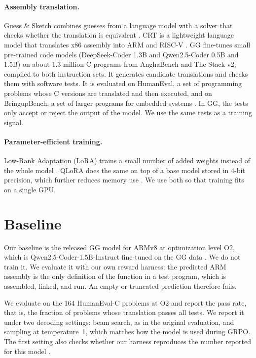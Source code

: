 \documentclass{article}
\newif\iftracked
\newcommand{\added}[1]{\iftracked\hl{#1}\else#1\fi}
\newcommand{\deleted}[1]{\iftracked\textcolor{red}{\st{#1}}\ \fi}
\begin{document}
\paragraph{Assembly translation.}
Guess \& Sketch combines guesses from a language model with a solver that checks whether the translation is equivalent \citep{guesssketch}. CRT is a lightweight language model that translates x86 assembly into ARM and RISC-V \citep{crt}. GG fine-tunes small pre-trained code models (DeepSeek-Coder 1.3B and Qwen2.5-Coder 0.5B and 1.5B) on about 1.3 million C programs from AnghaBench and The Stack v2, compiled to both instruction sets. It generates candidate translations and checks them with software tests. It is evaluated on HumanEval, a set of programming problems whose C versions are translated and then executed, and on BringupBench, a set of larger programs for embedded systems \citep{gg}. In GG, the tests only accept or reject the output of the model. We use the same tests as a training signal.

\paragraph{Parameter-efficient training.}
Low-Rank Adaptation (LoRA) trains a small number of added weights instead of the whole model \citep{lora}. QLoRA does the same on top of a base model stored in 4-bit precision, which further reduces memory use \citep{qlora}. We use both so that training fits on a single GPU.

\section{Baseline}
\label{sec:baseline}

Our baseline is the released GG model for ARMv8 at optimization level O2, which is Qwen2.5-Coder-1.5B-Instruct fine-tuned on the GG data \citep{gg}. We do not train it. We evaluate it with our own reward harness: the predicted ARM assembly is the only definition of the function in a test program, which is assembled, linked, and run. An empty or truncated prediction therefore fails. \deleted{This differs from the original evaluation, which compiles the C version of the function into the test binary and could let an empty prediction pass.}

We evaluate on the 164 HumanEval-C problems at O2 and report the pass rate, that is, the fraction of problems whose translation passes all tests. We report it under two decoding settings: beam search, as in the original evaluation, and sampling at temperature~1, which matches how the model is used during GRPO. The first setting also checks whether our harness reproduces the number reported for this model \citep{gg}.
\end{document}
